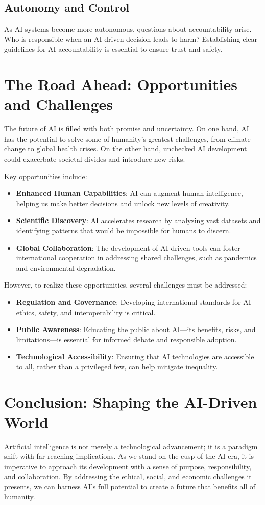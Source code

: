\documentclass{article}
\begin{document}
\subsection{Autonomy and Control}
As AI systems become more autonomous, questions about accountability arise. Who is responsible when an AI-driven decision leads to harm? Establishing clear guidelines for AI accountability is essential to ensure trust and safety.

\section{The Road Ahead: Opportunities and Challenges}

The future of AI is filled with both promise and uncertainty. On one hand, AI has the potential to solve some of humanity's greatest challenges, from climate change to global health crises. On the other hand, unchecked AI development could exacerbate societal divides and introduce new risks.

Key opportunities include:
\begin{itemize}
    \item \textbf{Enhanced Human Capabilities}: AI can augment human intelligence, helping us make better decisions and unlock new levels of creativity.
    \item \textbf{Scientific Discovery}: AI accelerates research by analyzing vast datasets and identifying patterns that would be impossible for humans to discern.
    \item \textbf{Global Collaboration}: The development of AI-driven tools can foster international cooperation in addressing shared challenges, such as pandemics and environmental degradation.
\end{itemize}

However, to realize these opportunities, several challenges must be addressed:
\begin{itemize}
    \item \textbf{Regulation and Governance}: Developing international standards for AI ethics, safety, and interoperability is critical.
    \item \textbf{Public Awareness}: Educating the public about AI---its benefits, risks, and limitations---is essential for informed debate and responsible adoption.
    \item \textbf{Technological Accessibility}: Ensuring that AI technologies are accessible to all, rather than a privileged few, can help mitigate inequality.
\end{itemize}

\section{Conclusion: Shaping the AI-Driven World}

Artificial intelligence is not merely a technological advancement; it is a paradigm shift with far-reaching implications. As we stand on the cusp of the AI era, it is imperative to approach its development with a sense of purpose, responsibility, and collaboration. By addressing the ethical, social, and economic challenges it presents, we can harness AI's full potential to create a future that benefits all of humanity.
\end{document}
